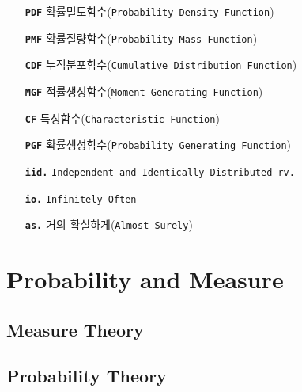 \documentclass[graybox,envcountchap,envcountsame,sectrefs,fleqn]{svmono}
\begin{document}
\begin{itemize}
    \item[\texttt{\textbf{PDF}}]{확률밀도함수(\texttt{Probability Density Function})}
    \item[\texttt{\textbf{PMF}}]{확률질량함수(\texttt{Probability Mass Function})}
    \item[\texttt{\textbf{CDF}}]{누적분포함수(\texttt{Cumulative Distribution Function})}
    \item[\texttt{\textbf{MGF}}]{적률생성함수(\texttt{Moment Generating Function})}
    \item[\texttt{\textbf{CF}}]{특성함수(\texttt{Characteristic Function})}
    \item[\texttt{\textbf{PGF}}]{확률생성함수(\texttt{Probability Generating Function})}
    \item[\texttt{\textbf{iid.}}]{\texttt{Independent and Identically Distributed rv.}}
    \item[\texttt{\textbf{io.}}]{\texttt{Infinitely Often}}
    \item[\texttt{\textbf{as.}}]{거의 확실하게(\texttt{Almost Surely})}
\end{itemize}

\tableofcontents

\mainmatter%

\part{Probability and Measure}

\chapter{Measure Theory}

%

\chapter{Probability Theory}





% 

\backmatter%
\end{document}

